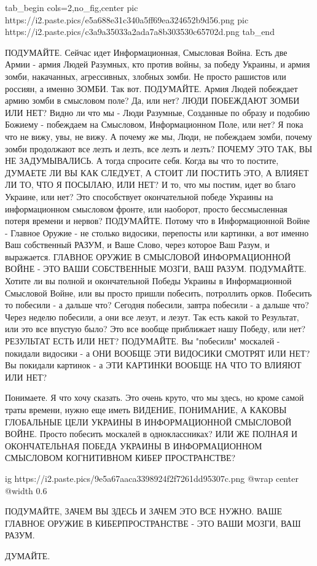 \ifcmt
  tab_begin cols=2,no_fig,center
     pic https://i2.paste.pics/e5a688e31c340a5ff69ea324652b9d56.png
		 pic https://i2.paste.pics/c3a9a35033a2ada7a8b303530c65702d.png
  tab_end
\fi

ПОДУМАЙТЕ. Сейчас идет Информационная, Смысловая Война. Есть две Армии - армия
Людей Разумных, кто против войны, за победу Украины, и армия зомби, накачанных,
агрессивных, злобных зомби. Не просто рашистов или россиян, а именно ЗОМБИ. Так
вот. ПОДУМАЙТЕ. Армия Людей побеждает армию зомби в смысловом поле? Да, или
нет? ЛЮДИ ПОБЕЖДАЮТ ЗОМБИ ИЛИ НЕТ? Видно ли что мы - Люди Разумные, Созданные
по образу и подобию Божиему - побеждаем на Смысловом, Информационном Поле, или
нет? Я пока что не вижу, увы, не вижу. А почему же мы, Люди, не побеждаем
зомби, почему зомби продолжают все лезть и лезть, все лезть и лезть? ПОЧЕМУ ЭТО
ТАК, ВЫ НЕ ЗАДУМЫВАЛИСЬ. А тогда спросите себя. Когда вы что то постите,
ДУМАЕТЕ ЛИ ВЫ КАК СЛЕДУЕТ, А СТОИТ ЛИ ПОСТИТЬ ЭТО, А ВЛИЯЕТ ЛИ ТО, ЧТО Я
ПОСЫЛАЮ, ИЛИ НЕТ? И то, что мы постим, идет во благо Украине, или нет? Это
способствует окончательной победе Украины на информационном смысловом фронте,
или наоборот, просто бессмысленная потеря времени и нервов? ПОДУМАЙТЕ. Потому
что в Информационной Войне - Главное Оружие - не столько видосики, перепосты
или картинки, а вот именно Ваш собственный РАЗУМ, и Ваше Слово, через которое
Ваш Разум, и выражается. ГЛАВНОЕ ОРУЖИЕ В СМЫСЛОВОЙ ИНФОРМАЦИОННОЙ ВОЙНЕ - ЭТО
ВАШИ СОБСТВЕННЫЕ МОЗГИ, ВАШ РАЗУМ. ПОДУМАЙТЕ. Хотите ли вы полной и
окончательной Победы Украины в Информационной Смысловой Войне, или вы просто
пришли побесить, потроллить орков. Побесить то побесили - а дальше что? Сегодня
побесили, завтра побесили - а дальше что? Через неделю побесили, а они все
лезут, и лезут. Так есть какой то Результат, или это все впустую было? Это все
вообще приближает нашу Победу, или нет? РЕЗУЛЬТАТ ЕСТЬ ИЛИ НЕТ? ПОДУМАЙТЕ. Вы
"побесили" москалей - покидали видосики - а ОНИ ВООБЩЕ ЭТИ ВИДОСИКИ СМОТРЯТ ИЛИ
НЕТ? Вы покидали картинок - а ЭТИ КАРТИНКИ ВООБЩЕ НА ЧТО ТО ВЛИЯЮТ ИЛИ НЕТ? 

Понимаете. Я что хочу сказать. Это очень круто, что мы здесь, но кроме самой
траты времени, нужно еще иметь ВИДЕНИЕ, ПОНИМАНИЕ, А КАКОВЫ ГЛОБАЛЬНЫЕ ЦЕЛИ
УКРАИНЫ В ИНФОРМАЦИОННОЙ СМЫСЛОВОЙ ВОЙНЕ.  Просто побесить москалей в
одноклассниках? ИЛИ ЖЕ ПОЛНАЯ И ОКОНЧАТЕЛЬНАЯ ПОБЕДА УКРАИНЫ В ИНФОРМАЦИОННОМ
СМЫСЛОВОМ КОГНИТИВНОМ КИБЕР ПРОСТРАНСТВЕ?

\ifcmt
  ig https://i2.paste.pics/9e5a67aaca3398924f2f7261dd95307c.png
  @wrap center
  @width 0.6
\fi

ПОДУМАЙТЕ, ЗАЧЕМ ВЫ ЗДЕСЬ И ЗАЧЕМ ЭТО ВСЕ НУЖНО. ВАШЕ ГЛАВНОЕ ОРУЖИЕ В
КИБЕРПРОСТРАНСТВЕ - ЭТО ВАШИ МОЗГИ, ВАШ РАЗУМ. 

ДУМАЙТЕ.
